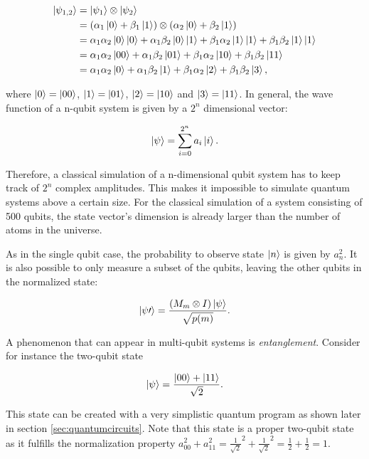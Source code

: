 \begin{align}
  \Ket{\psi_{1,2}} &= \Ket{\psi_1} \otimes \Ket{\psi_2} \\
                   &= (\alpha_1 \Ket{0} + \beta_1 \Ket{1}) \otimes (\alpha_2 \Ket{0} + \beta_2 \Ket{1}) \\
                   &= \alpha_1 \alpha_2 \Ket{0}\Ket{0} + \alpha_1 \beta_2 \Ket{0} \Ket{1} + \beta_1 \alpha_2 \Ket{1} \Ket{1} + \beta_1 \beta_2 \Ket{1} \Ket{1} \\
                   &= \alpha_1 \alpha_2 \Ket{00} + \alpha_1 \beta_2 \Ket{01} + \beta_1 \alpha_2 \Ket{10} + \beta_1 \beta_2 \Ket{11} \\
                   &= \alpha_1 \alpha_2 \Ket{0} + \alpha_1 \beta_2 \Ket{1} + \beta_1 \alpha_2 \Ket{2} + \beta_1 \beta_2 \Ket{3},
\end{align}

where $\Ket{0} = \Ket{00}$, $\Ket{1} = \Ket{01}$, $\Ket{2} = \Ket{10}$
and $\Ket{3} = \Ket{11}$. In general, the wave function of a
n-qubit system is given by a $2^n$ dimensional vector:

\begin{equation}
  \Ket{\psi} = \sum_{i=0}^{2^n}a_i \Ket{i}.
\end{equation}

Therefore, a classical simulation of a n-dimensional qubit system has to keep
track of $2^n$ complex amplitudes. This makes it impossible to simulate quantum
systems above a certain size. For the classical simulation of a system
consisting of 500 qubits, the state vector's dimension is already larger
than the number of atoms in the universe.  

As in the single qubit case, the probability to observe state $\Ket{n}$ is
given by $a_n^2$. It is also possible to only measure a subset of the qubits,
leaving the other qubits in the normalized state:

\begin{equation}
  \Ket{\psi\prime} = \frac{(M_m \otimes I) \Ket{\psi}}{\sqrt{p(m)}}.
\end{equation}

A phenomenon that can appear in multi-qubit systems is
\textit{entanglement}. Consider for instance the two-qubit state

\begin{equation}
  \Ket{\psi} = \frac{\Ket{00} + \Ket{11}}{\sqrt{2}}.
\end{equation}

This state can be created with a very simplistic quantum program as shown later in
section \ref{sec:quantumcircuits}.
Note that this state is a proper two-qubit state as it fulfills the
normalization property
$a_{00}^2 + a_{11}^2 = \frac{1}{\sqrt{2}}^2 + \frac{1}{\sqrt{2}}^2 = \frac{1}{2}
+ \frac{1}{2} = 1$.

